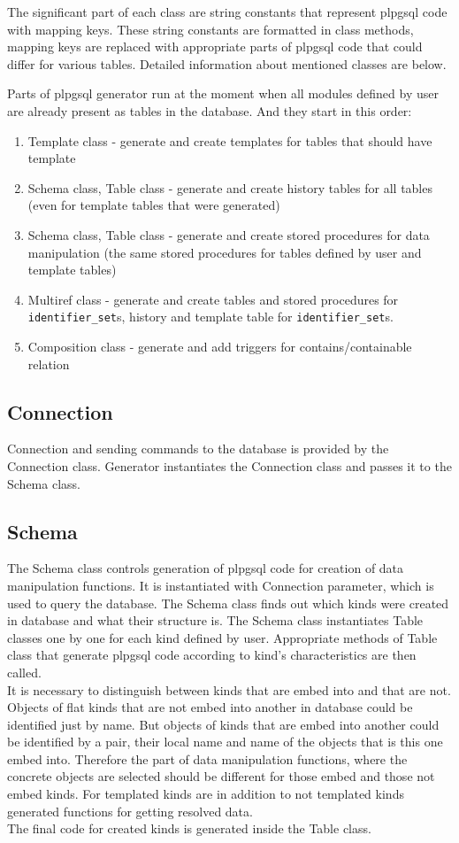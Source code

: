 \documentclass[deska]{subfiles}
\begin{document}
The significant part of each class are string constants that represent plpgsql code with mapping keys. These string constants are formatted in class methods, mapping keys are replaced with appropriate parts of plpgsql code that could differ for various tables.
Detailed information about mentioned classes are below.

Parts of plpgsql generator run at the moment when all modules defined by user are already present as tables in the database. And they start in this order:

\begin{enumerate}
    \item Template class - generate and create templates for tables that should have template
    \item Schema class, Table class - generate and create history tables for all tables (even for template tables that were generated)
    \item Schema class, Table class - generate and create stored procedures for data manipulation (the same stored procedures for tables defined by user and template tables)
    \item Multiref class - generate and create tables and stored procedures for {\tt identifier\_set}s, history and template table for {\tt identifier\_set}s.
    \item Composition class - generate and add triggers for contains/containable relation
\end{enumerate}

\subsection{Connection}
Connection and sending commands to the database is provided by the Connection class. Generator instantiates the Connection class and passes it to the Schema class.

\subsection{Schema}
The Schema class controls generation of plpgsql code for creation of data manipulation functions. It is instantiated with Connection parameter, which is used to query the database. 
The Schema class finds out which kinds were created in database and what their structure is. The Schema class instantiates Table classes one by one for each kind defined by user. Appropriate methods of Table class that generate plpgsql code according to kind's characteristics are then called.\\ It is necessary to distinguish between kinds that are embed into and that are not. Objects of flat kinds that are not embed into another in database could be identified just by name. But objects of kinds that are embed into another could be identified by a pair, their local name and name of the objects that is this one embed into. Therefore the part of data manipulation functions, where the concrete objects are selected should be different for those embed and those not embed kinds.
For templated kinds are in addition to not templated kinds generated functions for getting resolved data.\\
The final code for created kinds is generated inside the Table class.
\end{document}
